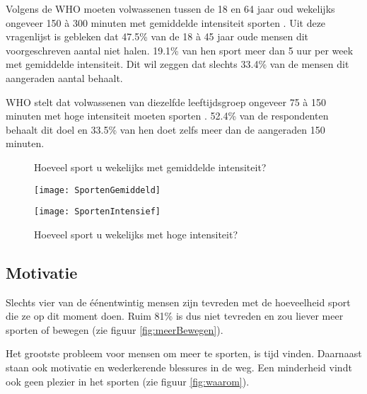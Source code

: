 Volgens de WHO moeten volwassenen tussen de 18 en 64 jaar oud wekelijks ongeveer 150 à 300 minuten met gemiddelde intensiteit sporten \autocite{Bull2020}.
Uit deze vragenlijst is gebleken dat 47.5\% van de 18 à 45 jaar oude mensen dit voorgeschreven aantal niet halen. 19.1\% van hen sport meer dan 5 uur per week met gemiddelde intensiteit. Dit wil zeggen dat slechts 33.4\% van de mensen dit aangeraden aantal behaalt.

WHO stelt dat volwassenen van diezelfde leeftijdsgroep ongeveer 75 à 150 minuten met hoge intensiteit moeten sporten \autocite{Bull2020}.
52.4\% van de respondenten behaalt dit doel en 33.5\% van hen doet zelfs meer dan de aangeraden 150 minuten.

\begin{figure}[htbp]
    \begin{minipage}[t]{0.48\linewidth} %
        \centering
        \caption[Hoeveel sport u wekelijks met gemiddelde intensiteit?]{Hoeveel sport u wekelijks met gemiddelde intensiteit?}
        \texttt{[image: SportenGemiddeld]}
        \label{fig:gemiddeldSporten}
    \end{minipage}
    \hfill
    \begin{minipage}[t]{0.48\linewidth} %
        \centering
        \caption[Hoeveel sport u wekelijks met hoge intensiteit?]{Hoeveel sport u wekelijks met hoge intensiteit?}
        \texttt{[image: SportenIntensief]}
        \label{fig:intensiefSporten}
    \end{minipage}
\end{figure}

\subsection{Motivatie}

Slechts vier van de éénentwintig mensen zijn tevreden met de hoeveelheid sport die ze op dit moment doen. Ruim 81\% is dus niet tevreden en zou liever meer sporten of bewegen (zie figuur \ref{fig:meerBewegen}).

Het grootste probleem voor mensen om meer te sporten, is tijd vinden. Daarnaast staan ook motivatie en wederkerende blessures in de weg. Een minderheid vindt ook geen plezier in het sporten (zie figuur \ref{fig:waarom}).

